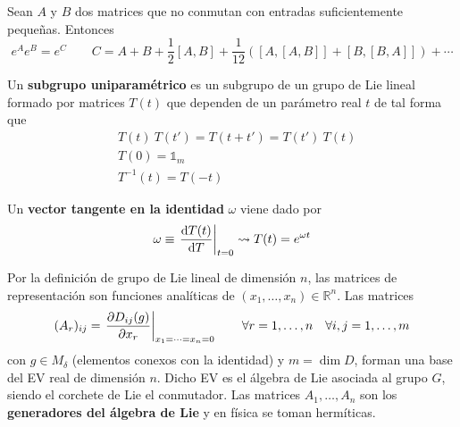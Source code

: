 \begin{relacion} Sean $A$ y $B$ dos matrices que no conmutan con entradas suficientemente pequeñas. Entonces
\begin{equation}
e^A e^B=e^C\qquad C=A+B+\frac{1}{2}[A,B]+\frac{1}{12}\left([A,[A,B]]+[B,[B,A]]\right)+\cdots
\end{equation}
\end{relacion}

\begin{definicion}
Un \textbf{subgrupo uniparamétrico} es un subgrupo de un grupo de Lie lineal formado por matrices $T(t)$ que dependen de un parámetro real $t$ de tal forma que
\begin{subequations}
\begin{flalign}
&T(t)\ T(t')=T(t+t')=T(t')\ T(t)\\
&T(0)=\mathbb{1}_m\\
&T^{-1}(t)=T(-t)
\end{flalign}
\end{subequations}

Un \textbf{vector tangente en la identidad} $\omega$ viene dado por
\begin{equation}
\omega\equiv \left.\frac{\mathrm{d}T(t)}{\mathrm{d}T}\right|_{t=0} \leadsto T(t)=e^{\omega t}
\end{equation}
\end{definicion}

\begin{definicion}
Por la definición de grupo de Lie lineal de dimensión $n$, las matrices de representación son funciones analíticas de $(x_1,\ldots,x_n)\in\mathbb{R}^n$. Las matrices
\begin{equation}
(A_r)_{ij}=\left.\frac{\partial D_{ij}(g)}{\partial x_r}\right|_{x_1=\cdots=x_n=0}\qquad \forall r=1,\ldots,n\quad \forall i,j=1,\ldots,m
\end{equation}
con $g\in M_\delta$ (elementos conexos con la identidad) y $m=\dim D$, forman una base del EV real de dimensión $n$. Dicho EV es el álgebra de Lie asociada al grupo $G$, siendo el corchete de Lie el conmutador. Las matrices $A_1,\ldots,A_n$ son los \textbf{generadores del álgebra de Lie} y en física se toman hermíticas.
\end{definicion}

